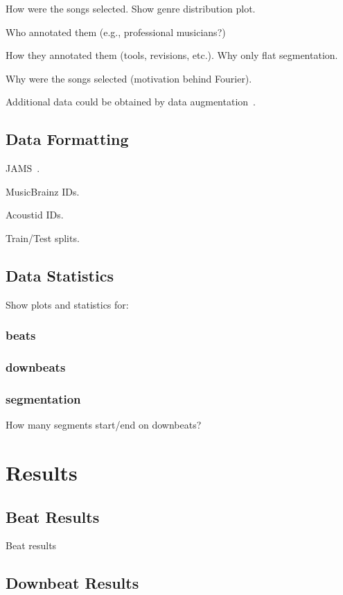 \documentclass{article}
\newcommand{\setName}{Fourier}
\begin{document}
How were the songs selected. Show genre distribution plot.

Who annotated them (e.g., professional musicians?)

How they annotated them (tools, revisions, etc.). Why only flat segmentation.

Why were the songs selected (motivation behind \setName).

Additional data could be obtained by data augmentation~\cite{Mcfee2015}.

\subsection{Data Formatting}

JAMS~\cite{Humphrey2014}.

MusicBrainz IDs.

Acoustid IDs.

Train/Test splits.

\subsection{Data Statistics}

Show plots and statistics for: 

\subsubsection{beats}

\subsubsection{downbeats}

\subsubsection{segmentation}

How many segments start/end on downbeats?

\section{Results}\label{sec:results}

\subsection{Beat Results}

Beat results

\subsection{Downbeat Results}
\end{document}
